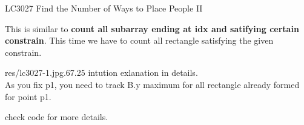 \begin{problem}{LC3027 Find the Number of Ways to Place People II}


\end{problem}


\begin{solution}

    This is similar to \textbf{count all subarray ending at idx and satifying certain constrain}. This time we have to count all rectangle satisfying the given constrain.

    \begin{lfigurecp}{res/lc3027-1.jpg}{.67}{.25}
        intution exlanation in details.\\
        As you fix p1, you need to track B.y maximum for all rectangle already formed for point p1.

        check code for more details.
    \end{lfigurecp}
    
\end{solution}